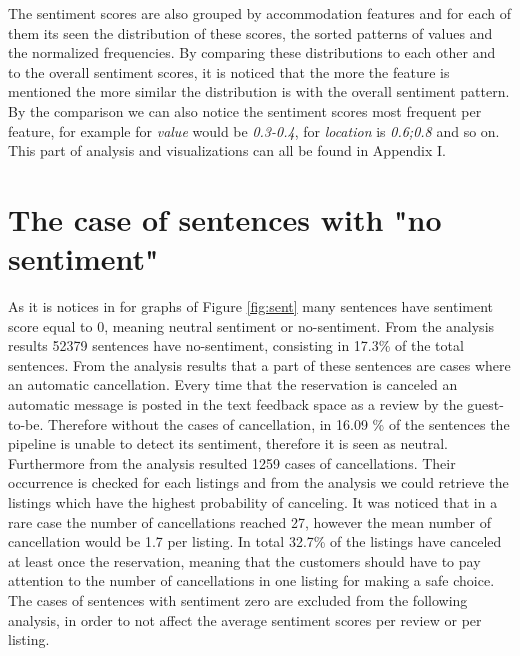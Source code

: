 The sentiment scores are also grouped by accommodation features and for each of them its seen the distribution of these scores, the sorted patterns of values and the normalized frequencies. By comparing these distributions to each other and to the overall sentiment scores, it is noticed that the more the feature is mentioned the more similar the distribution is with the overall sentiment pattern. By the comparison we can also notice the sentiment scores most frequent per feature, for example for \textit{value} would be \textit{0.3-0.4}, for \textit{location} is \textit{0.6;0.8} and so on. This part of analysis and visualizations can all be found in Appendix I.
\section{The case of sentences with "no sentiment"}
As it is notices in for graphs of Figure \ref{fig:sent} many sentences have sentiment score equal to 0, meaning neutral sentiment or no-sentiment. From the analysis results 52379 sentences have no-sentiment, consisting in 17.3\% of the total sentences. From the analysis results that a part of these sentences are cases where an automatic cancellation. Every time that the reservation is canceled an automatic message is posted in the text feedback space as a review by the guest-to-be. Therefore without the cases of cancellation, in 16.09 \% of the sentences the pipeline is unable to detect its sentiment, therefore it is seen as neutral. Furthermore from the analysis resulted 1259 cases of cancellations. Their occurrence is checked for each listings and from the analysis we could retrieve the listings which have the highest probability of canceling. It was noticed that in a rare case the number of cancellations reached 27, however the mean number of cancellation would be 1.7 per listing. In total 32.7\% of the listings have canceled at least once the reservation, meaning that the customers should  have to pay attention to the number of cancellations in one listing for making a safe choice. The cases of sentences with sentiment zero are excluded from the following analysis, in order to not affect the average sentiment scores per review or per listing.

